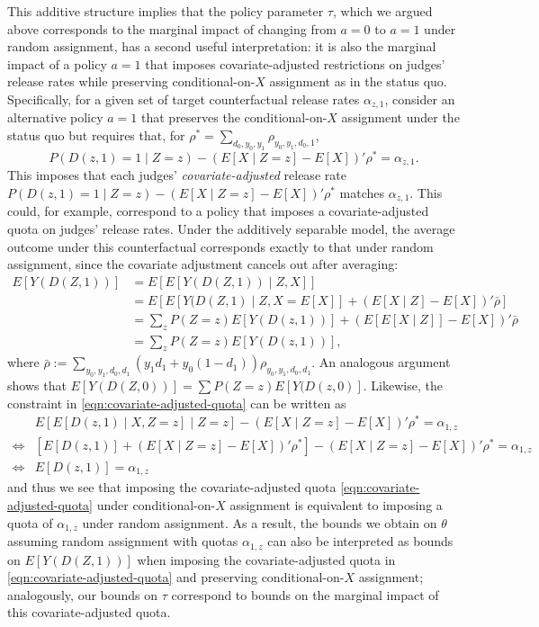 \documentclass[12pt]{article}%
\theoremstyle{definition}
\newcommand\1{\operatorname{I}\indicatorfence}
\begin{document}
\begin{appendices}
This additive structure implies that the policy parameter $\tau$, which we argued above corresponds to the marginal impact of changing from $a=0$ to $a=1$ under random assignment, has a second useful interpretation: it is also the marginal impact of a policy $a=1$ that imposes covariate-adjusted restrictions on judges' release rates while preserving conditional-on-$X$ assignment as in the status quo. Specifically, for a given set of target counterfactual release rates $\alpha_{z,1}$, consider an alternative policy $a=1$ that preserves the conditional-on-$X$ assignment under the status quo but requires that, for $\rho^* = \sum_{d_0,y_0,y_1} \rho_{y_0,y_1,d_0,1}$, \begin{equation}
P(D(z,1)=1 \mid Z=z) - (E[X\mid Z=z]-E[X])'\rho^* = \alpha_{z,1}. \label{eqn:covariate-adjusted-quota}
\end{equation}
This imposes that each judges' \emph{covariate-adjusted} release rate $P(D(z,1)=1 \mid Z=z) - (E[X\mid Z=z]-E[X])' \rho^*$ matches $\alpha_{z,1}$. This could, for example, correspond to a policy that imposes a covariate-adjusted quota on judges' release rates. Under the additively separable model, the average outcome under this counterfactual corresponds exactly to that under random assignment, since the covariate adjustment cancels out after averaging:
\begin{align*}
E[Y(D(Z,1))] &= E[ E[Y(D(Z,1)) \mid Z, X ] ] \\
& = E[ E[Y(D(Z,1) \mid Z, X= E[X]] + (E[X \mid Z] - E[X])' \bar\rho ]\\
& = \sum_{z} P(Z=z) E[Y(D(z,1))] + ( E[ E[X \mid Z] ] - E[X])' \bar\rho \\
& = \sum_{z} P(Z=z) E[Y(D(z,1))],
\end{align*}
where $\bar\rho := \sum_{y_0,y_1,d_0,d_1} (y_1 d_1 + y_0 (1-d_1)) \rho_{y_0,y_1,d_0,d_1}$. An analogous argument shows that $E[Y(D(Z,0))] = \sum P(Z=z) E[Y(D(z,0)]$. Likewise, the constraint in \eqref{eqn:covariate-adjusted-quota} can be written as
\begin{align*}
& E[ E[D(z,1) \mid X,Z=z] \mid Z=z ] - (E[X \mid Z=z] - E[X])'\rho^* = \alpha_{1,z} \\
\iff &[ E[D(z,1)] +  (E[X \mid Z=z] - E[X])'\rho^*] - (E[X \mid Z=z] - E[X])'\rho^* = \alpha_{1,z}  \\
\iff & E[D(z,1)] = \alpha_{1,z}
\end{align*}
and thus we see that imposing the covariate-adjusted quota \eqref{eqn:covariate-adjusted-quota} under conditional-on-$X$ assignment is equivalent to imposing a quota of $\alpha_{1,z}$ under random assignment. As a result, the bounds we obtain on $\theta$ assuming random assignment with quotas $\alpha_{1,z}$ can also be interpreted as bounds on $E[Y(D(Z,1))]$ when imposing the covariate-adjusted quota in \eqref{eqn:covariate-adjusted-quota} and preserving conditional-on-$X$ assignment; analogously, our bounds on $\tau$ correspond to bounds on the marginal impact of this covariate-adjusted quota.



\end{appendices}
\end{document}
